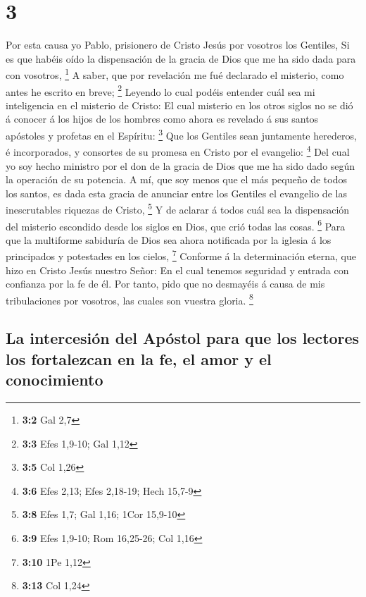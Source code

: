 \hypertarget{section-2}{%
\section{3}\label{section-2}}

 Por esta causa yo Pablo, prisionero de Cristo Jesús por
vosotros los Gentiles,  Si es que habéis oído la
dispensación de la gracia de Dios que me ha sido dada para con vosotros,
\footnote{\textbf{3:2} Gal 2,7}  A saber, que por
revelación me fué declarado el misterio, como antes he escrito en breve;
\footnote{\textbf{3:3} Efes 1,9-10; Gal 1,12}  Leyendo lo
cual podéis entender cuál sea mi inteligencia en el misterio de Cristo:
 El cual misterio en los otros siglos no se dió á conocer
á los hijos de los hombres como ahora es revelado á sus santos apóstoles
y profetas en el Espíritu: \footnote{\textbf{3:5} Col 1,26}
 Que los Gentiles sean juntamente herederos, é
incorporados, y consortes de su promesa en Cristo por el evangelio:
\footnote{\textbf{3:6} Efes 2,13; Efes 2,18-19; Hech 15,7-9}
 Del cual yo soy hecho ministro por el don de la gracia de
Dios que me ha sido dado según la operación de su potencia.
 A mí, que soy menos que el más pequeño de todos los
santos, es dada esta gracia de anunciar entre los Gentiles el evangelio
de las inescrutables riquezas de Cristo, \footnote{\textbf{3:8} Efes
  1,7; Gal 1,16; 1Cor 15,9-10}  Y de aclarar á todos cuál
sea la dispensación del misterio escondido desde los siglos en Dios, que
crió todas las cosas. \footnote{\textbf{3:9} Efes 1,9-10; Rom 16,25-26;
  Col 1,16}  Para que la multiforme sabiduría de Dios sea
ahora notificada por la iglesia á los principados y potestades en los
cielos, \footnote{\textbf{3:10} 1Pe 1,12}  Conforme á la
determinación eterna, que hizo en Cristo Jesús nuestro Señor:
 En el cual tenemos seguridad y entrada con confianza por
la fe de él.  Por tanto, pido que no desmayéis á causa de
mis tribulaciones por vosotros, las cuales son vuestra gloria.
\footnote{\textbf{3:13} Col 1,24}

\hypertarget{la-intercesiuxf3n-del-apuxf3stol-para-que-los-lectores-los-fortalezcan-en-la-fe-el-amor-y-el-conocimiento}{%
\subsection{La intercesión del Apóstol para que los lectores los
fortalezcan en la fe, el amor y el
conocimiento}\label{la-intercesiuxf3n-del-apuxf3stol-para-que-los-lectores-los-fortalezcan-en-la-fe-el-amor-y-el-conocimiento}}

